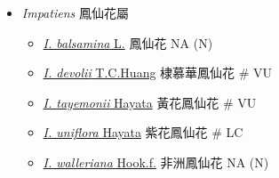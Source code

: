 
  \begin{itemize}
 \item[] \textit{Impatiens} 鳳仙花屬
                                
  \begin{itemize}
        \item[] \href{http://www.theplantlist.org/tpl1.1/search?q=Impatiens+balsamina}{\textit{I. balsamina} L.}   鳳仙花   NA (N)
        \item[] \href{http://www.theplantlist.org/tpl1.1/search?q=Impatiens+devolii}{\textit{I. devolii} T.C.Huang}   棣慕華鳳仙花  \# VU
        \item[] \href{http://www.theplantlist.org/tpl1.1/search?q=Impatiens+tayemonii}{\textit{I. tayemonii} Hayata}   黃花鳳仙花  \# VU
        \item[] \href{http://www.theplantlist.org/tpl1.1/search?q=Impatiens+uniflora}{\textit{I. uniflora} Hayata}   紫花鳳仙花  \# LC
        \item[] \href{http://www.theplantlist.org/tpl1.1/search?q=Impatiens+walleriana}{\textit{I. walleriana} Hook.f.}   非洲鳳仙花   NA (N)
  \end{itemize}
  \end{itemize}
